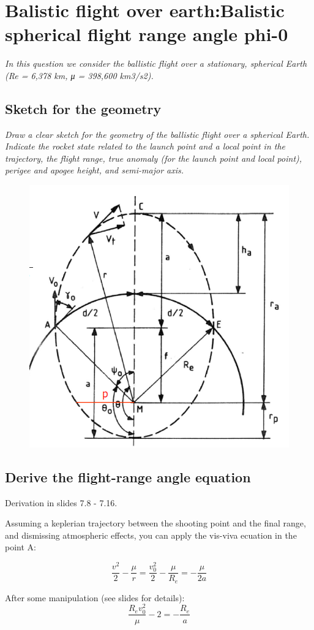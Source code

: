 \section{ Balistic flight over earth:Balistic spherical flight range  angle phi-0 }\label{sec:q3}  
\textit{In this question we consider the ballistic flight over a stationary, spherical Earth (Re = 6,378 km, μ = 398,600 km3/s2).}

  \subsection{Sketch for the geometry}
 \textit{ Draw a clear sketch for the geometry of the ballistic flight over a spherical   Earth. Indicate the rocket state related to the launch point and a local point in the  trajectory, the flight range, true anomaly (for the launch point and local point), perigee and apogee height, and semi-major axis.}
\begin{figure}[H]
	\centering
	\includegraphics[width=0.4\linewidth]{pics/screenshot001}
	\caption{}
	\label{fig:screenshot001}
\end{figure}

\subsection{Derive the flight-range angle equation}


Derivation in slides 7.8 - 7.16.


Assuming a keplerian trajectory between the shooting point and the final range, and dismissing atmospheric effects, you can apply the vis-viva ecuation in the point A: 

\begin{equation}
\frac{v^2}{2}-\frac{\mu}{r} =\frac{v_0^2}{2}-\frac{\mu}{R_e} =  -\frac{\mu}{2a}
\end{equation}

After some manipulation (see slides for details):
\begin{equation}
\frac{R_ev_0^2}{\mu}-2 = -\frac{R_e}{a}
\end{equation}

